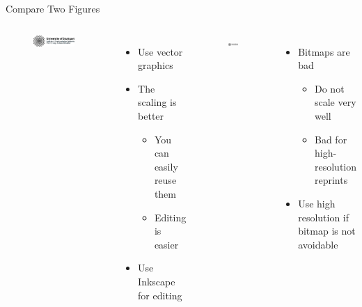 \documentclass[english,american,german,aspectratio=43]{beamer}
\begin{document}
\begin{frame}{Compare Two Figures}

  \begin{columns}[t]
    \noindent


    \noindent
    \begin{figure}
      \centering{}\includegraphics[width=0.9\textwidth]{img/logo_vector_example}
    \end{figure}

    \begin{itemize}
      \item Use vector graphics
      \item The scaling is better

        \begin{itemize}
          \item You can easily reuse them
          \item Editing is easier
        \end{itemize}
      \item Use Inkscape for editing
    \end{itemize}


    \begin{figure}
      \centering{}\includegraphics[width=0.9\textwidth]{img/logo_bitmap_example}
    \end{figure}

    \begin{itemize}
      \item Bitmaps are bad

        \begin{itemize}
          \item Do not scale very well
          \item Bad for high-resolution reprints
        \end{itemize}
      \item Use high resolution if bitmap is not avoidable
    \end{itemize}
  \end{columns}

\end{frame}
\end{document}
